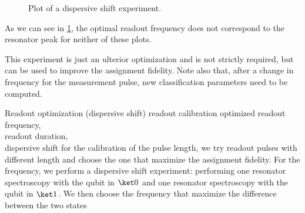 \begin{figure}[ht]
    \caption{Plot of a dispersive shift experiment.}
    \label{fig:dispersive_shift}
\end{figure}
As we can see in \cref{fig:dispersive_shift}, the optimal readout frequency does not correspond to the resonator peak for neither of these plots.

This experiment is just an ulterior optimization and is not strictly required, but can be used to improve the assignment fidelity.
Note also that, after a change in frequency for the measurement pulse, new classification parameters need to be computed.


\experimentrecap
{Readout optimization (dispersive shift)}
{readout calibration}
{optimized readout frequency,\\readout duration,\\dispersive shift}
{for the calibration of the pulse length, we try readout pulses with different length and choose the one that maximize the assignment fidelity. For the frequency, we perform a dispersive shift experiment: performing one resonator spectroscopy with the qubit in $\ket 0$ and one resonator spectroscopy with the qubit in $\ket 1$. We then choose the frequency that maximize the difference between the two states}




